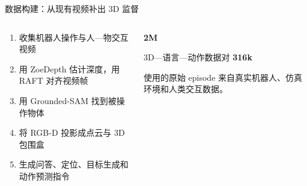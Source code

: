 \documentclass[aspectratio=169,11pt]{ctexbeamer}
\newcommand{\insertframesource}{}
\newcommand{\setsource}[1]{\gdef\insertframesource{#1}}
\begin{document}
\setsource{Refs.: [1] H. Zhen \emph{et al.}, \emph{Proc. ICML}, 2024, Sec. 3 and Table 8. [2] Open X-Embodiment Collaboration, ``Open X-Embodiment: Robotic Learning Datasets and RT-X Models,'' in \emph{Proc. ICRA}, 2024, pp. 6892--6903.}
\begin{frame}{数据构建：从现有视频补出 3D 监督}
\begin{columns}[c,onlytextwidth]
\begin{column}{0.61\textwidth}
\begin{enumerate}\item 收集机器人操作与人—物交互视频\item 用 ZoeDepth 估计深度，用 RAFT 对齐视频帧\item 用 Grounded-SAM 找到被操作物体\item 将 RGB-D 投影成点云与 3D 包围盒\item 生成问答、定位、目标生成和动作预测指令\end{enumerate}
\end{column}
\begin{column}{0.33\textwidth}
{\fontsize{32}{36}\selectfont\color{Teal}\textbf{2M}}\par 3D—语言—动作数据对\vspace{0.45cm}
{\fontsize{28}{32}\selectfont\color{Orange}\textbf{316k}}\par 使用的原始 episode\vspace{0.35cm}
{\small 来自真实机器人、仿真环境和人类交互数据。}
\end{column}
\end{columns}
\end{frame}
\end{document}
